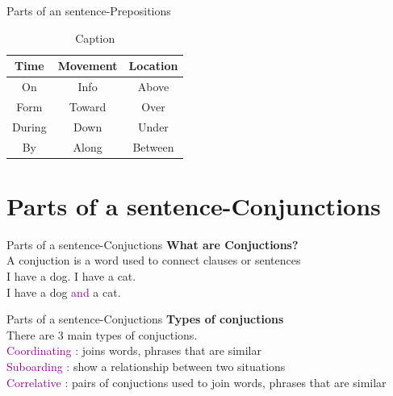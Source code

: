 \documentclass{beamer}
\begin{document}
\begin{frame}{Parts of an sentence-Prepositions}
\centering
\vspace{0.5in}
\begin{table}[]
    \centering
    
    
 \begin{tabular}{|c|c|c|}
 \hline
 Time & Movement & Location\\
 \hline
 On & Info & Above\\
 Form & Toward & Over\\
 During & Down & Under\\
 By & Along & Between\\
 \hline
 \end{tabular}
 \caption{Caption}
    \label{tab:placeholder}
\end{table}
\end{frame}

\section{Parts of a sentence-Conjunctions}

\begin{frame}{Parts of a sentence-Conjuctions}
\centering
\textbf{What are Conjuctions?}\\
\vspace{0.2in}
A conjuction is a word used to connect clauses or sentences\\
\vspace{0.2in}
I have a dog. I have a cat.\\
\vspace{0.2in}
I have a dog \textcolor{purple}{and} a cat.\\    
\end{frame}
\begin{frame}{Parts of a sentence-Conjuctions}
\centering
\textbf{Types of conjuctions}\\
\vspace{0.2in}
There are 3 main types of conjuctions.\\
\vspace{0.2in}
\textcolor{purple}{Coordinating :} joins words, phrases that are similar\\
\vspace{0.2in}
\textcolor{purple}{Suboarding :} show a relationship between two situations\\
\vspace{0.2in}
\textcolor{purple}{Correlative :} pairs of conjuctions used to join words, phrases that are similar\\    
\end{frame}
\end{document}
